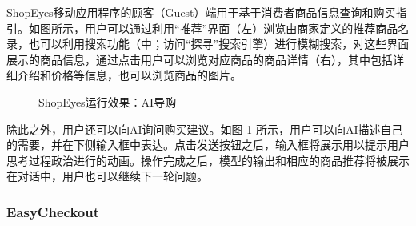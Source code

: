 ShopEyes移动应用程序的顾客（Guest）端用于基于消费者商品信息查询和购买指引。如图所示，用户可以通过利用“推荐”界面（左）浏览由商家定义的推荐商品名录，也可以利用搜索功能（中；访问“探寻”搜索引擎）进行模糊搜索，对这些界面展示的商品信息，通过点击用户可以浏览对应商品的商品详情（右），其中包括详细介绍和价格等信息，也可以浏览商品的图片。

\begin{figure}[htbp]
    \centering
    \hfill
	\caption{ShopEyes运行效果：AI导购}
	\label{fig:seg-assist}
\end{figure}

除此之外，用户还可以向AI询问购买建议。如图 \ref{fig:seg-assist} 所示，用户可以向AI描述自己的需要，并在下侧输入框中表达。点击发送按钮之后，输入框将展示用以提示用户思考过程政治进行的动画。操作完成之后，模型的输出和相应的商品推荐将被展示在对话中，用户也可以继续下一轮问题。

\subsubsection{EasyCheckout}

